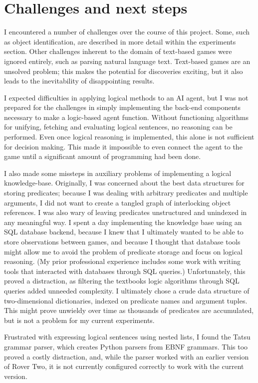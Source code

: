 \section{Challenges and next steps}

I encountered a number of challenges over the course of this project.
Some, such as object identification, are described in more detail within
the experiments section. Other challenges inherent to the domain of
text-based games were ignored entirely, such as parsing natural language
text. Text-based games are an unsolved problem; this makes the potential
for discoveries exciting, but it also leads to the inevitability of
disappointing results.

I expected difficulties in applying logical methods to an AI agent, but
I was not prepared for the challenges in simply implementing the
back-end components necessary to make a logic-based agent function.
Without functioning algorithms for unifying, fetching and evaluating
logical sentences, no reasoning can be performed. Even once logical
reasoning is implemented, this alone is not sufficient for decision
making. This made it impossible to even connect the agent to the game
until a significant amount of programming had been done.

I also made some missteps in auxiliary problems of implementing a
logical knowledge-base. Originally, I was concerned about the best data
structures for storing predicates; because I was dealing with arbitrary
predicates and multiple arguments, I did not want to create a tangled
graph of interlocking object references. I was also wary of leaving
predicates unstructured and unindexed in any meaningful way. I spent a
day implementing the knowledge base using an SQL database backend,
because I knew that I ultimately wanted to be able to store observations
between games, and because I thought that database tools might allow me
to avoid the problem of predicate storage and focus on logical
reasoning. (My prior professional experience includes some work with
writing tools that interacted with databases through SQL queries.)
Unfortunately, this proved a distraction, as filtering the textbooks
logic algorithms through SQL queries added unneeded complexity. I
ultimately chose a crude data structure of two-dimensional dictionaries,
indexed on predicate names and argument tuples. This might prove
unwieldy over time as thousands of predicates are accumulated, but is
not a problem for my current experiments.

Frustrated with expressing logical sentences using nested lists, I found
the Tatsu grammar parser, which creates Python parsers from EBNF
grammars. This too proved a costly distraction, and, while the parser
worked with an earlier version of Rover Two, it is not currently
configured correctly to work with the current version.

